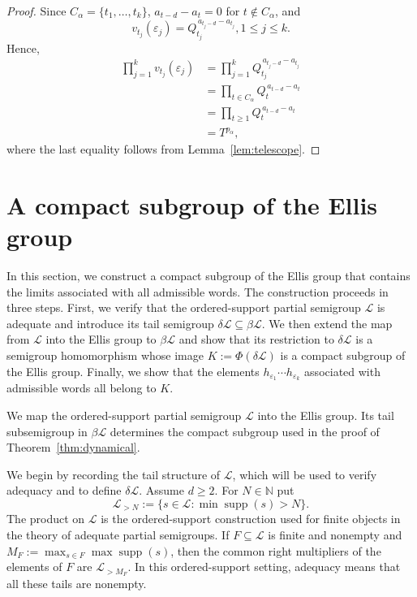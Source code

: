 \documentclass[11pt]{amsart}
\theoremstyle{definition}
\theoremstyle{remark}
\newcommand{\N}{\mathbb N}
\newcommand{\cL}{\mathcal L}
\newcommand{\supp}{\operatorname{supp}}
\begin{document}
\begin{proof}
Since $C_\alpha =\{t_1,\ldots,t_k\}$, $a_{t-d}-a_t=0$ for $t\notin C_\alpha$, and 
\[
 v_{t_j}(\varepsilon_j)
=Q_{t_j}^{\,a_{t_j-d}-a_{t_j}}, 1\le j\le k.  
\]
Hence,
\[
\begin{aligned}
\prod_{j=1}^k v_{t_j}(\varepsilon_j)
&=\prod_{j=1}^kQ_{t_j}^{\,a_{t_j-d}-a_{t_j}}\\
&=\prod_{t\in C_\alpha} Q_t^{\,a_{t-d}-a_t}\\
&=\prod_{t\ge1} 
Q_t^{\,a_{t-d}-a_t}\\
&=T^{p_\alpha},
\end{aligned}
\]
where the last equality follows from Lemma~\ref{lem:telescope}.


\end{proof}

\section{A compact subgroup of the Ellis group}\label{sec:compact-subgroup}
In this section, we construct a compact subgroup of the Ellis group that contains the
limits associated with all admissible words.  The construction proceeds
in three steps.  First, we verify that the ordered-support partial
semigroup $\cL$ is adequate and introduce its tail semigroup
$\delta\cL\subseteq\beta\cL$.  We then extend the map from $\cL$ into the
Ellis group to $\beta\cL$ and show that its restriction to $\delta\cL$
is a semigroup homomorphism whose image $K:=\Phi(\delta\cL)$
is a compact subgroup of the Ellis group.  Finally, we show that the
elements $h_{\varepsilon_1}\cdots h_{\varepsilon_k}$ associated with
admissible words all belong to $K$.

We map the ordered-support partial semigroup $\cL$ into the Ellis group.  Its
tail subsemigroup in $\beta\cL$ determines the compact subgroup used in the
proof of Theorem~\ref{thm:dynamical}.

We begin by recording the tail structure of $\cL$, which will be used to verify adequacy and to define $\delta\cL$.
Assume $d\geq2$.  For $N\in\N$ put
\[
 \cL_{>N}:=\{s\in\cL:\min\supp(s)>N\}.
\]
The product on $\cL$ is the ordered-support construction used for finite
objects in the theory of adequate partial semigroups.  
If
$F\subseteq\cL$ is finite and nonempty and $M_F:=\max_{s\in F}\max\supp(s)$,
then the common right multipliers of the elements of $F$ are
$\cL_{>M_F}$.  In this ordered-support setting, adequacy means that all these
tails are nonempty.
\end{document}
